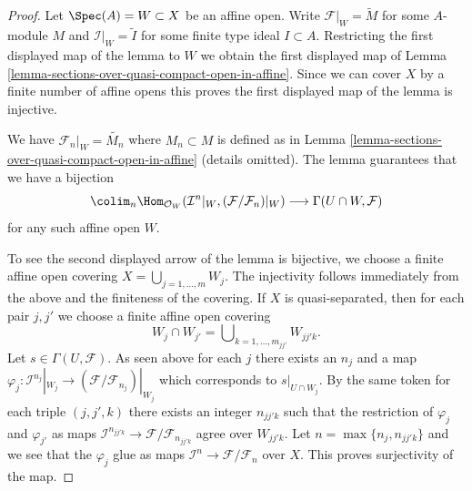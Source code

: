\begin{proof}
Let $\Spec(A) = W \subset X$ be an affine open. Write
$\mathcal{F}|_W = \widetilde{M}$ for some $A$-module $M$
and $\mathcal{I}|_W = \widetilde{I}$ for some finite type
ideal $I \subset A$. Restricting the first displayed map
of the lemma to $W$ we obtain the first displayed map of
Lemma \ref{lemma-sections-over-quasi-compact-open-in-affine}.
Since we can cover $X$ by a finite number of affine opens this
proves the first displayed map of the lemma is injective.

\medskip\noindent
We have $\mathcal{F}_n|_W = \widetilde{M_n}$ where
$M_n \subset M$ is defined as in
Lemma \ref{lemma-sections-over-quasi-compact-open-in-affine}
(details omitted). The lemma guarantees that we have a bijection
$$
\colim_n  \Hom_{\mathcal{O}_W}(
\mathcal{I}^n|_W, (\mathcal{F}/\mathcal{F}_n)|_W)
\longrightarrow
\Gamma(U \cap W, \mathcal{F})
$$
for any such affine open $W$.

\medskip\noindent
To see the second displayed arrow of the lemma is bijective,
we choose a finite affine open covering $X = \bigcup_{j = 1, \ldots, m} W_j$.
The injectivity follows immediately from the above and the finiteness of
the covering. If $X$ is quasi-separated, then for each pair
$j, j'$ we choose a finite affine open covering
$$
W_j \cap W_{j'} = \bigcup\nolimits_{k = 1, \ldots, m_{jj'}} W_{jj'k}.
$$
Let $s \in \Gamma(U, \mathcal{F})$. As seen above for each $j$ there exists
an $n_j$ and a map
$\varphi_j : \mathcal{I}^{n_j}|_{W_j} \to
(\mathcal{F}/\mathcal{F}_{n_j})|_{W_j}$
which corresponds to $s|_{U \cap W_j}$.
By the same token for each triple $(j, j', k)$ there exists an integer
$n_{jj'k}$ such that the restriction of $\varphi_j$ and $\varphi_{j'}$
as maps $\mathcal{I}^{n_{jj'k}} \to \mathcal{F}/\mathcal{F}_{n_{jj'k}}$
agree over $W_{jj'k}$. Let $n = \max\{n_j, n_{jj'k}\}$ and we see that
the $\varphi_j$ glue as maps
$\mathcal{I}^n \to \mathcal{F}/\mathcal{F}_n$ over $X$.
This proves surjectivity of the map.
\end{proof}













